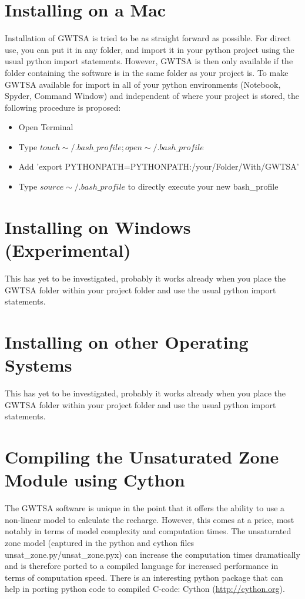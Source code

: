 \section{Installing on a Mac}
Installation of GWTSA is tried to be as straight forward as possible. For direct use, you can put it in any folder, and import it in your python project using the usual python import statements. However, GWTSA is then only available if the folder containing the software is in the same folder as your project is. To make GWTSA available for import in all of your python environments (Notebook, Spyder, Command Window) and independent of where your project is stored, the following procedure is proposed:

\begin{itemize}
\item{Open Terminal}
\item{Type $touch \sim/.bash\_profile; open \sim/.bash\_profile$}
\item{Add 'export PYTHONPATH=\textdollar PYTHONPATH:/your/Folder/With/GWTSA' }		
\item{Type $source \sim/.bash\_profile$ to directly execute your new bash\_profile}
\end{itemize}

\section{Installing on Windows (Experimental)}
This has yet to be investigated, probably it works already when you place the GWTSA folder within your project folder and use the usual python import statements.

\section{Installing on other Operating Systems}
This has yet to be investigated, probably it works already when you place the GWTSA folder within your project folder and use the usual python import statements.

\section{Compiling the Unsaturated Zone Module using Cython}
The GWTSA software is unique in the point that it offers the ability to use a non-linear model to calculate the recharge. However, this comes at a price, most notably in terms of model complexity and computation times. The unsaturated zone model (captured in the python and cython files unsat\_zone.py/unsat\_zone.pyx) can increase the computation times dramatically and is therefore ported to a compiled language for increased performance in terms of computation speed. There is an interesting python package that can help in porting python code to compiled C-code: Cython (\url{http://cython.org}).

